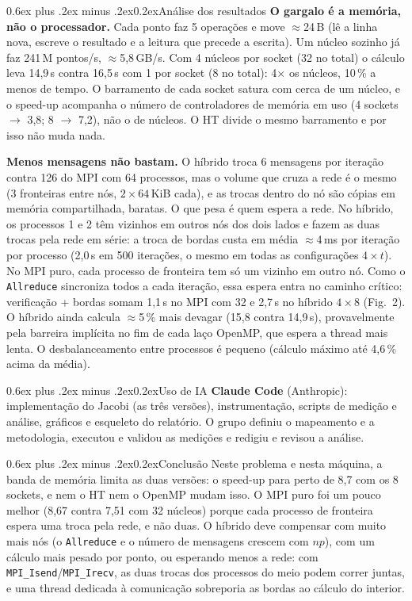 \documentclass[10pt,a4paper,twocolumn]{article}
\makeatletter
\renewcommand\section{\@startsection{section}{1}{0pt}%
  {0.6ex plus .2ex minus .2ex}{0.2ex}{\normalsize\bfseries}}
\makeatother
\begin{document}
\section{Análise dos resultados}
\textbf{O gargalo é a memória, não o processador.} Cada ponto faz 5
operações e move $\approx$24\,B (lê a linha nova, escreve o resultado e a
leitura que precede a escrita). Um núcleo sozinho já faz 241\,M pontos/s,
$\approx$5,8\,GB/s. Com 4 núcleos por socket (32 no total) o cálculo leva
14,9\,s contra 16,5\,s com 1 por socket (8 no total): 4$\times$ os núcleos,
10\,\% a menos de tempo. O barramento de cada socket satura com cerca de um
núcleo, e o speed-up acompanha o número de controladores de memória em uso
(4 sockets $\to$ 3,8; 8 $\to$ 7,2), não o de núcleos. O HT divide o mesmo
barramento e por isso não muda nada.

\textbf{Menos mensagens não bastam.} O híbrido troca 6 mensagens por iteração
contra 126 do MPI com 64 processos, mas o volume que cruza a rede é o mesmo
(3 fronteiras entre nós, $2 \times 64$\,KiB cada), e as trocas dentro do nó
são cópias em memória compartilhada, baratas. O que pesa é quem espera a
rede. No híbrido, os processos 1 e 2 têm vizinhos em outros nós dos dois
lados e fazem as duas trocas pela rede em série: a troca de bordas custa em
média $\approx$4\,ms por iteração por processo (2,0\,s em 500 iterações, o
mesmo em todas as configurações $4 \times t$). No MPI puro, cada processo de fronteira tem só um vizinho em
outro nó. Como o \texttt{Allreduce} sincroniza todos a cada iteração, essa
espera entra no caminho crítico: verificação + bordas somam 1,1\,s no MPI
com 32 e 2,7\,s no híbrido $4 \times 8$ (Fig.~2). O híbrido ainda calcula
$\approx$5\,\% mais devagar (15,8 contra 14,9\,s), provavelmente pela barreira
implícita no fim de cada laço OpenMP, que espera a thread mais lenta. O
desbalanceamento entre processos é pequeno (cálculo máximo até 4,6\,\% acima
da média).

\section{Uso de IA}
\textbf{Claude Code} (Anthropic): implementação do Jacobi (as três versões),
instrumentação, scripts de medição e análise, gráficos e esqueleto do
relatório. O grupo definiu o mapeamento e a metodologia, executou e validou
as medições e redigiu e revisou a análise.

\section{Conclusão}
Neste problema e nesta máquina, a banda de memória limita as duas versões:
o speed-up para perto de 8,7 com os 8 sockets, e nem o HT nem o OpenMP mudam
isso. O MPI puro foi um pouco melhor (8,67 contra 7,51 com 32 núcleos)
porque cada processo de fronteira espera uma troca pela rede, e não duas.
O híbrido deve compensar com muito mais nós (o \texttt{Allreduce} e o número
de mensagens crescem com $np$), com um cálculo mais pesado por ponto, ou
esperando menos a rede: com \texttt{MPI\_Isend}/\texttt{MPI\_Irecv}, as duas
trocas dos processos do meio podem correr juntas, e uma thread dedicada à
comunicação sobreporia as bordas ao cálculo do interior.
\end{document}
